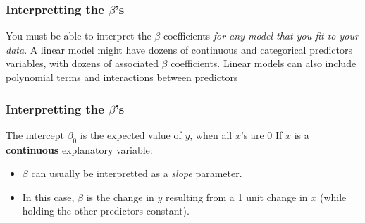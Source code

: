 \documentclass[color=usenames,dvipsnames]{beamer}\usepackage[]{graphicx}\usepackage[]{color}
\begin{document}
\begin{frame}
  \frametitle{Interpretting the $\beta$'s}
You must be able to interpret the $\beta$
coefficients {\it for any model that you fit to your data}.
\pause
\vfill
A linear model might have dozens of continuous and categorical
predictors variables, with dozens of associated $\beta$ coefficients.
\pause
\vfill
Linear models can also include polynomial terms and interactions
between predictors
\end{frame}


\begin{frame}
  \frametitle{Interpretting the $\beta$'s}%
  The intercept $\beta_0$ is the expected value of $y$, when all $x$'s are 0
  \pause
  \vfill
  If $x$ is a {\bf continuous} explanatory variable: %
  \begin{itemize}
    \item $\beta$ can usually be interpretted as a \textit{slope}
      parameter.
    \item In this case, $\beta$ is the
      change in $y$ resulting from a 1 unit change in $x$ (while
      holding the other predictors constant).
  \end{itemize}
\end{frame}
\end{document}
